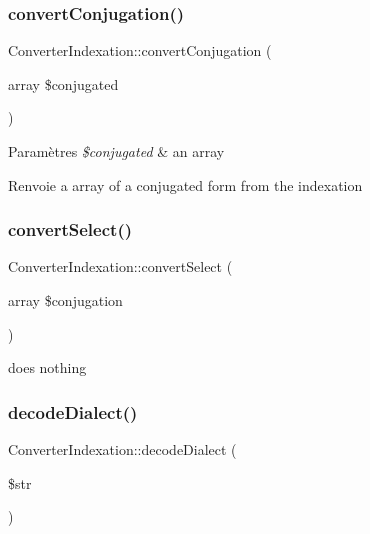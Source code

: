 \subsubsection{\texorpdfstring{convert\+Conjugation()}{convertConjugation()}}
{\footnotesize\ttfamily Converter\+Indexation\+::convert\+Conjugation (\begin{DoxyParamCaption}\item[{array}]{\$conjugated }\end{DoxyParamCaption})}


\begin{DoxyParams}{Paramètres}
{\em \$conjugated} & an array \\
\hline
\end{DoxyParams}
\begin{DoxyReturn}{Renvoie}
a array of a conjugated form from the indexation 
\end{DoxyReturn}
\hypertarget{class_converter_indexation_a066755523513b6c4197765c631c7b248}{}\label{class_converter_indexation_a066755523513b6c4197765c631c7b248} 
\subsubsection{\texorpdfstring{convert\+Select()}{convertSelect()}}
{\footnotesize\ttfamily Converter\+Indexation\+::convert\+Select (\begin{DoxyParamCaption}\item[{array}]{\$conjugation }\end{DoxyParamCaption})}

does nothing \hypertarget{class_converter_indexation_a138e9e08f03d5a14fc53d367c9c739de}{}\label{class_converter_indexation_a138e9e08f03d5a14fc53d367c9c739de} 
\subsubsection{\texorpdfstring{decode\+Dialect()}{decodeDialect()}}
{\footnotesize\ttfamily Converter\+Indexation\+::decode\+Dialect (\begin{DoxyParamCaption}\item[{}]{\$str }\end{DoxyParamCaption})}



